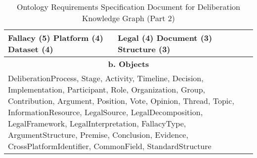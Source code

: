 \documentclass[11pt,a4paper]{article}
\begin{document}
\begin{table}[ht]
\begin{tabular}{|l|l|l|l|l|l|l|l|}
{Fallacy (5)\newline
Platform (4)\newline
Dataset (4)
} &
\multicolumn{5}{p{3.15cm}|}{
Legal (4)\newline
Document (3)\newline
Structure (3)
} \\
\hline
\multicolumn{8}{|c|}{\textbf{b. Objects}} \\
\hline
\multicolumn{8}{|p{14cm}|}{
DeliberationProcess, Stage, Activity, Timeline, Decision, Implementation, Participant, Role, Organization, Group, Contribution, Argument, Position, Vote, Opinion, Thread, Topic, InformationResource, LegalSource, LegalDecomposition, LegalFramework, LegalInterpretation, FallacyType, ArgumentStructure, Premise, Conclusion, Evidence, CrossPlatformIdentifier, CommonField, StandardStructure
} \\
\hline
\end{tabular}
\caption{Ontology Requirements Specification Document for Deliberation Knowledge Graph (Part 2)}
\label{tab:ORSD-2}
\end{table}
\end{document}
